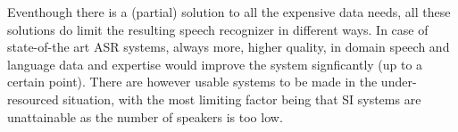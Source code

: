 \documentclass[b5paper]{article}
\newcommand{\todo}[2]{{\textcolor{red}{\bf [#1] #2 }}}
\newcommand{\ns}{{North Sámi }}
\begin{document}
Eventhough there is a (partial) solution to all the expensive data needs, all these solutions do limit the resulting speech recognizer in different ways. In case of state-of-the art ASR systems, always more, higher quality, in domain speech and language data and expertise would improve the system signficantly (up to a certain point). There are however usable systems to be made in the under-resourced situation, with the most limiting factor being that SI systems are unattainable as the number of speakers is too low.




%	
%	
%	
%	
\end{document}

